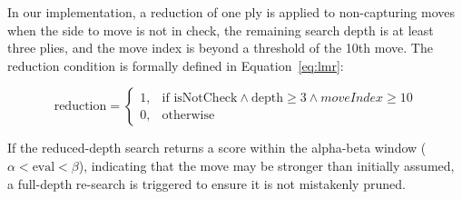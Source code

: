 \par
In our implementation, a reduction of one ply is applied to non-capturing moves when the side to move is not in check, the remaining search depth is at least three plies, and the move index is beyond a threshold of the 10th move. The reduction condition is formally defined in Equation~\ref{eq:lmr}:

\vspace{1em}

\begin{equation}
\text{reduction} = 
\begin{cases}
1, & \text{if } \text{isNotCheck} \wedge \text{depth} \geq 3 \wedge moveIndex \geq 10 \\
0, & \text{otherwise}
\end{cases}
\label{eq:lmr}
\end{equation}

\vspace{1em}

\par
If the reduced-depth search returns a score within the alpha-beta window ($\alpha < \text{eval} < \beta$), indicating that the move may be stronger than initially assumed, a full-depth re-search is triggered to ensure it is not mistakenly pruned.


